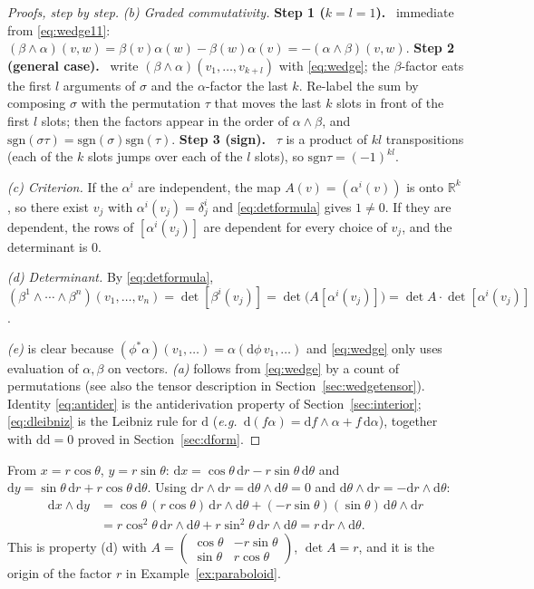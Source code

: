 \documentclass[11pt,a4paper]{article}
\numberwithin{equation}{section}
\theoremstyle{definition}
\theoremstyle{plain}
\newcommand{\Step}[2]{\textbf{Step #1 (#2).}\ }
\newcommand{\R}{\mathbb{R}}
\newcommand{\dd}{\mathrm{d}}
\newcommand{\sgn}{\mathrm{sgn}}
\newcommand{\pb}{{}^{*}}                            %
\newcommand{\eg}{\emph{e.g.}\ }
\begin{document}
\begin{proof}[Proofs, step by step]
\emph{(b) Graded commutativity.} \Step{1}{$k=l=1$} immediate from \eqref{eq:wedge11}:
$(\beta\wedge\alpha)(v,w)=\beta(v)\alpha(w)-\beta(w)\alpha(v)=-(\alpha\wedge\beta)(v,w)$.
\Step{2}{general case} write $(\beta\wedge\alpha)(v_1,\dots,v_{k+l})$ with \eqref{eq:wedge}; the $\beta$-factor eats the first $l$
arguments of $\sigma$ and the $\alpha$-factor the last $k$. Re-label the sum by composing $\sigma$ with the permutation $\tau$ that
moves the last $k$ slots in front of the first $l$ slots; then the factors appear in the order of $\alpha\wedge\beta$, and
$\sgn(\sigma\tau)=\sgn(\sigma)\sgn(\tau)$. \Step{3}{sign} $\tau$ is a product of $kl$ transpositions (each of the $k$ slots jumps
over each of the $l$ slots), so $\sgn\tau=(-1)^{kl}$.

\emph{(c) Criterion.} If the $\alpha^i$ are independent, the map $A(v)=(\alpha^i(v))$ is onto $\R^k$, so there exist $v_j$ with
$\alpha^i(v_j)=\delta^i_j$ and \eqref{eq:detformula} gives $1\neq0$. If they are dependent, the rows of $[\alpha^i(v_j)]$ are dependent
for every choice of $v_j$, and the determinant is $0$.

\emph{(d) Determinant.} By \eqref{eq:detformula}, $(\beta^1\wedge\cdots\wedge\beta^n)(v_1,\dots,v_n)=\det[\beta^i(v_j)]=\det\bigl(A[\alpha^i(v_j)]\bigr)=\det A\cdot\det[\alpha^i(v_j)]$.

\emph{(e)} is clear because $(\phi\pb\alpha)(v_1,\dots)=\alpha(\dd\phi\,v_1,\dots)$ and \eqref{eq:wedge} only uses evaluation of $\alpha,\beta$ on
vectors. \emph{(a)} follows from \eqref{eq:wedge} by a count of permutations (see also the tensor description in
Section~\ref{sec:wedgetensor}). Identity \eqref{eq:antider} is the antiderivation property of Section~\ref{sec:interior};
\eqref{eq:dleibniz} is the Leibniz rule for $\dd$ (\eg $\dd(f\alpha)=\dd f\wedge\alpha+f\,\dd\alpha$), together with $\dd\dd=0$ proved in
Section~\ref{sec:dform}.
\end{proof}

\begin{example}\label{ex:polarwedge}
From $x=r\cos\theta$, $y=r\sin\theta$: $\dd x=\cos\theta\,\dd r-r\sin\theta\,\dd\theta$ and
$\dd y=\sin\theta\,\dd r+r\cos\theta\,\dd\theta$. Using $\dd r\wedge\dd r=\dd\theta\wedge\dd\theta=0$ and
$\dd\theta\wedge\dd r=-\dd r\wedge\dd\theta$:
\begin{align*}
\dd x\wedge\dd y&=\cos\theta\,(r\cos\theta)\,\dd r\wedge\dd\theta+(-r\sin\theta)(\sin\theta)\,\dd\theta\wedge\dd r\\
&=r\cos^2\theta\,\dd r\wedge\dd\theta+r\sin^2\theta\,\dd r\wedge\dd\theta=r\,\dd r\wedge\dd\theta .
\end{align*}
This is property (d) with $A=\begin{pmatrix}\cos\theta&-r\sin\theta\\ \sin\theta&r\cos\theta\end{pmatrix}$, $\det A=r$, and it is the
origin of the factor $r$ in Example~\ref{ex:paraboloid}.
\end{example}
\end{document}
